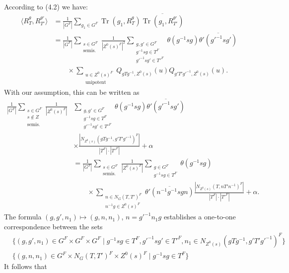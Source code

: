 \documentclass[11pt]{amsart}
\theoremstyle{plain}
\theoremstyle{remark}
\DeclareMathOperator{\Tr}{Tr}
\begin{document}
According to (4.2) we have:
\begin{align*}
\langle R_T^\theta, R_{T'}^{\theta'} \rangle &= \frac{1}{|G^F|} \sum_{g_1 \in G^F} \Tr(g_1, R_T^\theta) \overline{\Tr(g_1, R_{T'}^{\theta'})} \\
&= \frac{1}{|G^F|} \sum_{\substack{s \in G^F \\ \text{semis.}}} \frac{1}{|Z^0(s)^F|^2} \sum_{\substack{g, g' \in G^F \\ g^{-1}sg \in T^F \\ g'^{-1}sg' \in T'^F}} \theta(g^{-1}sg)\overline{\theta'(g'^{-1}sg')} \\
&\qquad \times \sum_{\substack{u \in Z^0(s)^F \\ \text{unipotent}}} Q_{gTg^{-1}, Z^0(s)}(u) Q_{g'T'g'^{-1}, Z^0(s)}(u).
\end{align*}
With our assumption, this can be written as
\begin{align*}
\frac{1}{|G^F|} \sum_{\substack{s \in G^F \\ s \notin Z \\ \text{semis.}}} \frac{1}{|Z^0(s)^F|} &\sum_{\substack{g, g' \in G^F \\ g^{-1}sg \in T^F \\ g'^{-1}sg' \in T'^F}} \theta(g^{-1}sg)\overline{\theta'(g'^{-1}sg')} \\
&\times \frac{|N_{Z^0(s)}(gTg^{-1}, g'T'g'^{-1})^F|}{|T^F| \cdot |T'^F|} + \alpha \\
&= \frac{1}{|G^F|} \sum_{\substack{s \in G^F \\ \text{semis.}}} \frac{1}{|Z^0(s)^F|} \sum_{\substack{g \in G^F \\ g^{-1}sg \in T^F}} \theta(g^{-1}sg) \\
&\qquad \times \sum_{\substack{n \in N_G(T, T')^F \\ n^{-1}g \in Z^0(s)^F}} \overline{\theta'(n^{-1}g^{-1}sgn)} \frac{|N_{Z^0(s)}(T, nT'n^{-1})^F|}{|T^F| \cdot |T'^F|} + \alpha.
\end{align*}
The formula $(g, g', n_1) \mapsto (g, n, n_1)$, $n = g'^{-1}n_1g$ establishes a one-to-one correspondence between the sets
\begin{align*}
&\{(g, g', n_1) \in G^F \times G^F \times G^F \mid g^{-1}sg \in T^F, g'^{-1}sg' \in T'^F, n_1 \in N_{Z^0(s)}(gTg^{-1}, g'T'g'^{-1})^F\} \\
&\{(g, n, n_1) \in G^F \times N_G(T, T')^F \times Z^0(s)^F \mid g^{-1}sg \in T^F\}
\end{align*}
It follows that
\end{document}
